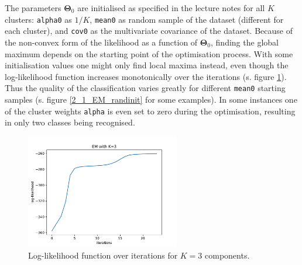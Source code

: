 \documentclass{article}
\begin{document}
The parameters $\mathbf{\Theta}_0$ are initialised as specified in the lecture notes for all $K$ clusters: \texttt{alpha0} as $1/K$, \texttt{mean0} as random sample of the dataset (different for each cluster), and \texttt{cov0} as the multivariate covariance of the dataset. Because of the non-convex form of the likelihood as a function of $\mathbf{\Theta}_0$, finding the global maximum depends on the starting point of the optimisation process. With some initialisation values one might only find local maxima instead, even though the log-likelihood function increases monotonically over the iterations (s. figure \ref{2_1_EM_likelihood}). Thus the quality of the classification varies greatly for different \texttt{mean0} starting samples (s. figure \ref{2_1_EM_randinit} for some examples). In some instances one of the cluster weights \texttt{alpha} is even set to zero during the optimisation, resulting in only two classes being recognised.\\

\begin{figure}[!ht]
\centering
\includegraphics[width=0.6\textwidth]{./Figures/2_1_EM_likelihood_K3}
\caption{Log-likelihood function over iterations for $K=3$ components.}
\label{2_1_EM_likelihood}
\end{figure}
\end{document}
